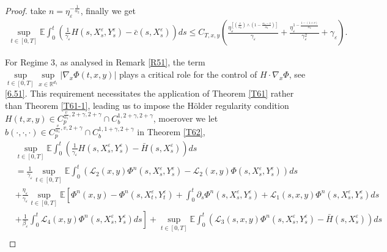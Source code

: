 \documentclass[11pt,reqno]{amsart}
\numberwithin{equation}{section}
\begin{document}
\begin{proof}
 take $n=\eta_{\varepsilon}^{-\frac{1}{\alpha_{2}}}$,    finally we get
\begin{equation}\label{6.48}
	\begin{split}
		\sup_{t\in [0,T]}\mathbb{E}  \int_{0}^{t}\left(  \frac{1}{\gamma_{\varepsilon}}H(s,X_{s}^{\varepsilon},Y_{s}^{\varepsilon})- \bar{c}(s,X_{s}^{\varepsilon})\right) ds  \leq C_{T,x,y}\left( \frac{ \eta_{\varepsilon}^{\left[\left(  \frac{v}{\alpha_{2}}\right) \wedge \left( 1-\frac{\alpha_{1}-v}{\alpha_{2}} \right)  \right]  }}{\gamma_{\varepsilon}}+\frac{ \eta_{\varepsilon}^{1-\frac{1-(1\wedge v)}{\alpha_{2}}}}{\gamma^{2}_{\varepsilon}}+\gamma_{\varepsilon}\right) .
	\end{split}
\end{equation}

For Regime 3,  as analysed in Remark \ref{R51}, the term $	\underset{t\in [0,T]}{\sup}\underset{x\in \mathbb{R}^{d_{1}}}{\sup}|\nabla_{x}\Phi(t,x,y)|$ plays a critical role for the control of $H\cdot\nabla_{x} \Phi$, see \eqref{6.51}. This requirement necessitates the application of Theorem \ref{T61} rather than Theorem \ref{T61-1}, leading us to impose the Hölder regularity condition  $H(t,x,y)\in C_{p}^{\frac{v}{\alpha_{1}},2+\gamma,2+\gamma}\cap C_{b}^{1,2+\gamma,2+\gamma}$, moerover we let $b(\cdot,\cdot,\cdot)\in C_{p}^{\frac{v}{\alpha_{1}},v,2+\gamma}\cap C_{b}^{1,1+\gamma,2+\gamma}$ in Theorem \ref{T62},
\begin{equation}\label{6.49}
	\begin{split}
		&	\sup_{t\in [0,T]}\mathbb{E}\int_{0}^{t}(\frac{1}{\gamma_{\varepsilon}} H(s,X_{s}^{\varepsilon},Y_{s}^{\varepsilon})- \bar{H}(s,X_{s}^{\varepsilon}))ds\\
		&=\frac{1}{\gamma_{\varepsilon}}	\sup_{t\in [0,T]}\mathbb{E}\int_{0}^{t}\left( \mathcal{L}_{2}(x,y)\Phi^{n}(s,X_{s}^{\varepsilon},Y_{s}^{\varepsilon})-\mathcal{L}_{2}(x,y)\Phi(s,X_{s}^{\varepsilon},Y_{s}^{\varepsilon})\right) ds\\
		&+\frac{\eta_{\varepsilon}}{{\gamma_{\varepsilon}}}	\sup_{t\in [0,T]}\mathbb{E}\left[ \Phi^{n}(x,y)-\Phi^{n}(s,X_{t}^{\varepsilon},Y_{t}^{\varepsilon}) +\int_{0}^{t}\partial_{s}\Phi^{n}(s,X_{s}^{\varepsilon},Y_{s}^{\varepsilon})+\mathcal{L}_{1}(s,x,y)\Phi^{n}(s,X_{s}^{\varepsilon},Y_{s}^{\varepsilon})ds\right.	\\
		&\left. +\frac{1}{\beta_{\varepsilon}}\int_{0}^{t}\mathcal{L}_{4}(x,y)\Phi^{n}(s,X_{s}^{\varepsilon},Y_{s}^{\varepsilon})ds\right]+	\sup_{t\in [0,T]}\mathbb{E}\int_{0}^{t}(\mathcal{L}_{3}(s,x,y)\Phi^{n}(s,X_{s}^{\varepsilon},Y_{s}^{\varepsilon})- \bar{H}(s,X_{s}^{\varepsilon}))ds\\

\end{split}
\end{equation}
\end{proof}
\end{document}
